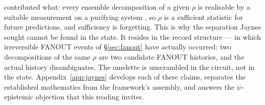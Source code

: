 contributed what: every ensemble decomposition of a given $\rho$ is
realisable by a suitable measurement on a purifying system
\autocite{schrodinger1936probability,hughston1993ensemble}, so $\rho$
is a sufficient statistic for future predictions, and sufficiency is
forgetting. This is why the separation Jaynes sought cannot be found
in the state. It resides in the record structure --- in which
irreversible FANOUT events of \S\ref{sec:fanout} have actually
occurred: two decompositions of the same $\rho$ are two candidate
FANOUT histories, and the actual history disambiguates. The omelette
is unscrambled in the circuit, not in the state.
Appendix~\ref{app:jaynes} develops each of these claims, separates the
established mathematics from the framework's assembly, and answers the
$\psi$-epistemic objection that this reading invites.
